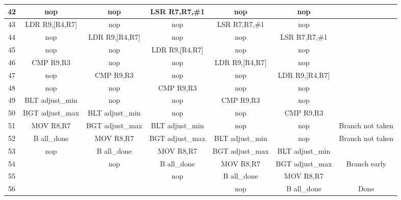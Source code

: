 \documentclass{article}
\begin{document}
{\begin{landscape}
\begin{longtable}{|c|c|c|c|c|c|c|}
            42 & nop & nop & LSR R7,R7,\#1 & nop & nop & \\ \hline
            43 & LDR R9,[R4,R7] & nop & nop & LSR R7,R7,\#1 & nop & \\ \hline
            44 & nop & LDR R9,[R4,R7] & nop & nop & LSR R7,R7,\#1 & \\ \hline
            45 & nop & nop & LDR R9,[R4,R7] & nop & nop & \\ \hline
            46 & CMP R9,R3 & nop & nop & LDR R9,[R4,R7] & nop & \\ \hline
            47 & nop & CMP R9,R3 & nop & nop & LDR R9,[R4,R7] & \\ \hline
            48 & nop & nop & CMP R9,R3 & nop & nop & \\ \hline
            49 & BLT adjust\_min & nop & nop & CMP R9,R3 & nop & \\ \hline
            50 & BGT adjust\_max & BLT adjust\_min & nop & nop & CMP R9,R3 & \\ \hline
            51 & MOV R8,R7 & BGT adjust\_max & BLT adjust\_min & nop & nop & Branch not taken \\ \hline
            52 & B all\_done & MOV R8,R7 & BGT adjust\_max & BLT adjust\_min & nop & Branch not taken \\ \hline
            53 & nop & B all\_done & MOV R8,R7 & BGT adjust\_max & BLT adjust\_min & \\ \hline
            54 & & nop & B all\_done & MOV R8,R7 & BGT adjust\_max & Branch early \\ \hline
            55 & & & nop & B all\_done & MOV R8,R7 & \\ \hline
            56 & & & & nop & B all\_done & Done \\ \hline
        \end{longtable}
    \end{landscape}
    \clearpage%
}
\end{document}
